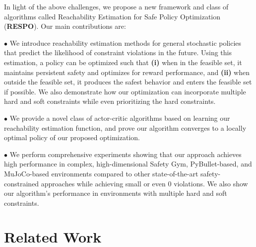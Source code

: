 \documentclass{article}
\theoremstyle{definition}
\begin{document}
In light of the above challenges, we propose a new framework and class of algorithms called Reachability Estimation for Safe Policy Optimization (\textbf{RESPO}). Our main contributions are:

$\bullet$\hspace{0.3cm} We introduce reachability estimation methods for general stochastic policies that predict the likelihood of constraint violations in the future. Using this estimation, a policy can be optimized such that \textbf{(i)} when in the feasible set, it maintains persistent safety and optimizes for reward performance, and \textbf{(ii)} when outside the feasible set, it produces the safest behavior and enters the feasible set if possible. We also demonstrate how our optimization can incorporate multiple hard and soft constraints while even prioritizing the hard constraints.

$\bullet$\hspace{0.3cm} We provide a novel class of actor-critic algorithms based on learning our reachability estimation function, and prove our algorithm converges to a locally optimal policy of our proposed optimization.

$\bullet$\hspace{0.3cm} We perform comprehensive experiments showing that our approach achieves high performance in complex, high-dimensional Safety Gym, PyBullet-based, and MuJoCo-based environments compared to other state-of-the-art safety-constrained approaches while achieving small or even $0$ violations. We also show our algorithm's performance in environments with multiple hard and soft constraints. 


\section{Related Work}
\vspace{-5pt}
\end{document}
